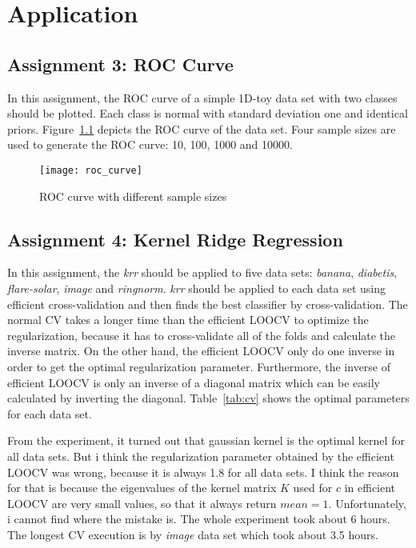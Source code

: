 \chapter{Application}
\label{chap:application}


\section{Assignment 3: ROC Curve}
\label{assignment3}

In this assignment, the ROC curve of a simple 1D-toy data set with two classes should be plotted. Each class is normal with standard deviation one and identical priors. Figure~\ref{fig:roc_curve} depicts the ROC curve of the data set. Four sample sizes are used to generate the ROC curve: 10, 100, 1000 and 10000.

\begin{figure}[h!]
	\centering
	\texttt{[image: roc\_curve]}
	\caption{ROC curve with different sample sizes}
	\label{fig:roc_curve}
\end{figure}


\section{Assignment 4: Kernel Ridge Regression}
\label{assignment4}

In this assignment, the \textit{krr} should be applied to five data sets: \textit{banana}, \textit{diabetis}, \textit{flare-solar}, \textit{image} and \textit{ringnorm}. \textit{krr} should be applied to each data set using efficient cross-validation and then finds the best classifier by cross-validation. The normal CV takes a longer time than the efficient LOOCV to optimize the regularization, because it has to cross-validate all of the folds and calculate the inverse matrix. On the other hand, the efficient LOOCV only do one inverse in order to get the optimal regularization parameter. Furthermore, the inverse of efficient LOOCV is only an inverse of a diagonal matrix which can be easily calculated by inverting the diagonal. Table~\ref{tab:cv} shows the optimal parameters for each data set.

From the experiment, it turned out that gaussian kernel is the optimal kernel for all data sets. But i think the regularization parameter obtained by the efficient LOOCV was wrong, because it is always 1.8 for all data sets. I think the reason for that is because the eigenvalues of the kernel matrix $K$ used for $c$ in efficient LOOCV are very small values, so that it always return $mean=1$. Unfortunately, i cannot find where the mistake is. The whole experiment took about 6 hours. The longest CV execution is by \textit{image} data set which took about 
3.5 hours.

